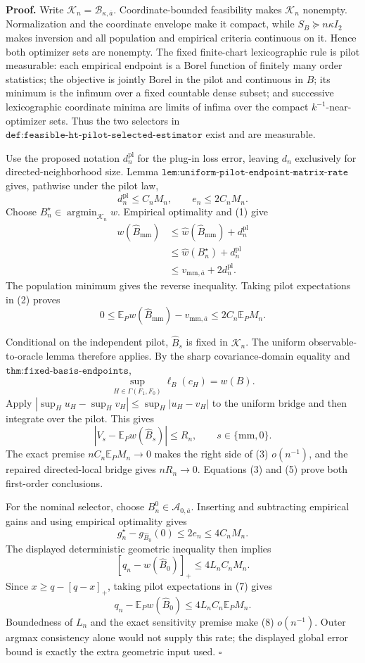 \textbf{Proof.}
Write \(\mathcal K_n=\mathcal B_{\kappa,\overline a}\).  Coordinate-bounded feasibility makes \(\mathcal K_n\) nonempty.  Normalization and the coordinate envelope make it compact, while \(S_B\succeq n\kappa I_2\) makes inversion and all population and empirical criteria continuous on it.  Hence both optimizer sets are nonempty.  The fixed finite-chart lexicographic rule is pilot measurable: each empirical endpoint is a Borel function of finitely many order statistics; the objective is jointly Borel in the pilot and continuous in \(B\); its minimum is the infimum over a fixed countable dense subset; and successive lexicographic coordinate minima are limits of infima over the compact \(k^{-1}\)-near-optimizer sets.  Thus the two selectors in \(\texttt{def:feasible-ht-pilot-selected-estimator}\) exist and are measurable.

Use the proposed notation \(d_n^{\mathrm{pl}}\) for the plug-in loss error, leaving \(d_n\) exclusively for directed-neighborhood size.  Lemma \(\texttt{lem:uniform-pilot-endpoint-matrix-rate}\) gives, pathwise under the pilot law,
\[
d_n^{\mathrm{pl}}\le C_nM_n,
\qquad
e_n\le2C_nM_n.
\tag{1}
\]
Choose \(B_n^\star\in\operatorname*{argmin}_{\mathcal K_n}w\).  Empirical optimality and (1) give
\[
\begin{aligned}
w(\widehat B_{\mathrm{mm}})
&\le\widehat w(\widehat B_{\mathrm{mm}})+d_n^{\mathrm{pl}}\\
&\le\widehat w(B_n^\star)+d_n^{\mathrm{pl}}\\
&\le v_{\mathrm{mm},\overline a}+2d_n^{\mathrm{pl}}.
\end{aligned}
\tag{2}
\]
The population minimum gives the reverse inequality.  Taking pilot expectations in (2) proves
\[
0\le\mathbb E_Pw(\widehat B_{\mathrm{mm}})-v_{\mathrm{mm},\overline a}
\le2C_n\mathbb E_PM_n.
\tag{3}
\]

Conditional on the independent pilot, \(\widehat B_s\) is fixed in \(\mathcal K_n\).  The uniform observable-to-oracle lemma therefore applies.  By the sharp covariance-domain equality and \(\texttt{thm:fixed-basis-endpoints}\),
\[
\sup_{H\in\Gamma(F_1,F_0)}\ell_B(c_H)=w(B).
\tag{4}
\]
Apply \(|\sup_Hu_H-\sup_Hv_H|\le\sup_H|u_H-v_H|\) to the uniform bridge and then integrate over the pilot.  This gives
\[
|V_s-\mathbb E_Pw(\widehat B_s)|\le R_n,
\qquad s\in\{\mathrm{mm},0\}.
\tag{5}
\]
The exact premise \(nC_n\mathbb E_PM_n\to0\) makes the right side of (3) \(o(n^{-1})\), and the repaired directed-local bridge gives \(nR_n\to0\).  Equations (3) and (5) prove both first-order conclusions.

For the nominal selector, choose \(B_n^0\in\mathcal A_{0,\overline a}\).  Inserting and subtracting empirical gains and using empirical optimality gives
\[
g_n^\star-g_{\widehat B_0}(0)
\le2e_n\le4C_nM_n.
\tag{6}
\]
The displayed deterministic geometric inequality then implies
\[
[q_n-w(\widehat B_0)]_+
\le4L_nC_nM_n.
\tag{7}
\]
Since \(x\ge q-[q-x]_+\), taking pilot expectations in (7) gives
\[
q_n-\mathbb E_Pw(\widehat B_0)
\le4L_nC_n\mathbb E_PM_n.
\tag{8}
\]
Boundedness of \(L_n\) and the exact sensitivity premise make (8) \(o(n^{-1})\).  Outer argmax consistency alone would not supply this rate; the displayed global error bound is exactly the extra geometric input used. \(\square\)